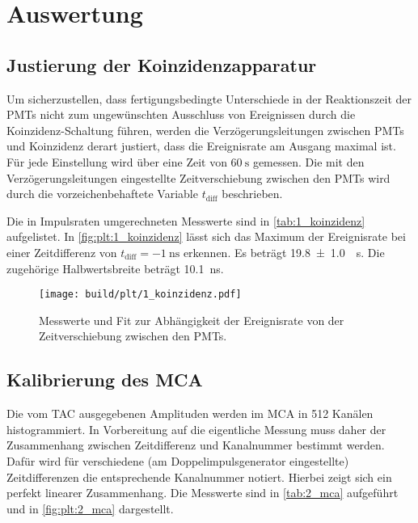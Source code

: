 \section{Auswertung}
\label{sec:auswertung}

\subsection{Justierung der Koinzidenzapparatur} \label{sec:auswertung:koinzidenz}
Um sicherzustellen,
dass fertigungsbedingte Unterschiede in der Reaktionszeit der \acp{PMT}
nicht zum ungewünschten Ausschluss von Ereignissen durch die Koinzidenz-Schaltung führen,
werden die Verzögerungsleitungen zwischen \acp{PMT} und Koinzidenz derart justiert,
dass die Ereignisrate am Ausgang maximal ist.
Für jede Einstellung wird über eine Zeit von $\SI{60}{\second}$ gemessen.
%
Die mit den Verzögerungsleitungen eingestellte Zeitverschiebung zwischen den \acp{PMT}
wird durch die vorzeichenbehaftete Variable $t_\text{diff}$ beschrieben.

Die in Impulsraten umgerechneten Messwerte sind in \autoref{tab:1_koinzidenz} aufgelistet.
In \autoref{fig:plt:1_koinzidenz} lässt sich das Maximum der Ereignisrate
bei einer Zeitdifferenz von $t_\text{diff} = \SI{-1}{\nano\second}$ erkennen.
Es beträgt \SI{19.8 \pm 1.0}{\per\second}.
Die zugehörige Halbwertsbreite beträgt \SI{10.1}{\nano\second}.

\begin{table}
    \centering
    \caption{Messwerte zur Abhängigkeit der Ereignisrate von der Zeitverschiebung zwischen den \acp{PMT}.}
    \label{tab:1_koinzidenz}
\end{table}

\begin{figure}
    \centering
    \texttt{[image: build/plt/1\_koinzidenz.pdf]}
    \caption{Messwerte und Fit zur Abhängigkeit der Ereignisrate von der Zeitverschiebung zwischen den \acp{PMT}.}
    \label{fig:plt:1_koinzidenz}
\end{figure}


\FloatBarrier
\subsection{Kalibrierung des \acs{MCA}} \label{sec:auswertung:mca}
Die vom \ac{TAC} ausgegebenen Amplituden werden im \ac{MCA} in \num{512} Kanälen histogrammiert.
In Vorbereitung auf die eigentliche Messung muss daher
der Zusammenhang zwischen Zeitdifferenz und Kanalnummer bestimmt werden.
Dafür wird für verschiedene (am Doppelimpulsgenerator eingestellte) Zeitdifferenzen
die entsprechende Kanalnummer notiert.
Hierbei zeigt sich ein perfekt linearer Zusammenhang.
Die Messwerte sind in \autoref{tab:2_mca} aufgeführt und in \autoref{fig:plt:2_mca} dargestellt.

